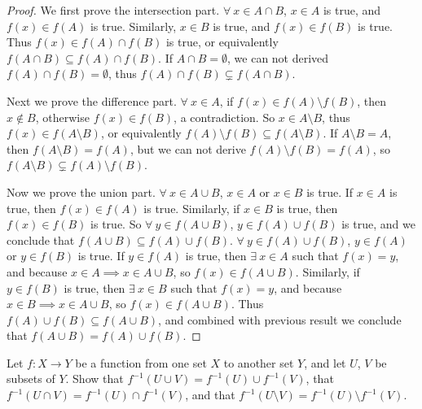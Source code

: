 \begin{proof}
We first prove the intersection part.
\(\forall\ x \in A \cap B\), \(x \in A\) is true, and \(f(x) \in f(A)\) is true.
Similarly, \(x \in B\) is true, and \(f(x) \in f(B)\) is true.
Thus \(f(x) \in f(A) \cap f(B)\) is true, or equivalently \(f(A \cap B) \subseteq f(A) \cap f(B)\).
If \(A \cap B = \emptyset\), we can not derived \(f(A) \cap f(B) = \emptyset\), thus \(f(A) \cap f(B) \subsetneq f(A \cap B)\).

Next we prove the difference part.
\(\forall\ x \in A\), if \(f(x) \in f(A) \setminus f(B)\), then \(x \notin B\), otherwise \(f(x) \in f(B)\), a contradiction.
So \(x \in A \setminus B\), thus \(f(x) \in f(A \setminus B)\), or equivalently \(f(A) \setminus f(B) \subseteq f(A \setminus B)\).
If \(A \setminus B = A\), then \(f(A \setminus B) = f(A)\), but we can not derive \(f(A) \setminus f(B) = f(A)\), so \(f(A \setminus B) \subsetneq f(A) \setminus f(B)\).

Now we prove the union part.
\(\forall\ x \in A \cup B\), \(x \in A\) or \(x \in B\) is true.
If \(x \in A\) is true, then \(f(x) \in f(A)\) is true.
Similarly, if \(x \in B\) is true, then \(f(x) \in f(B)\) is true.
So \(\forall\ y \in f(A \cup B)\), \(y \in f(A) \cup f(B)\) is true, and we conclude that \(f(A \cup B) \subseteq f(A) \cup f(B)\).
\(\forall\ y \in f(A) \cup f(B)\), \(y \in f(A)\) or \(y \in f(B)\) is true.
If \(y \in f(A)\) is true, then \(\exists\ x \in A\) such that \(f(x) = y\), and because \(x \in A \implies x \in A \cup B\), so \(f(x) \in f(A \cup B)\).
Similarly, if \(y \in f(B)\) is true, then \(\exists\ x \in B\) such that \(f(x) = y\), and because \(x \in B \implies x \in A \cup B\), so \(f(x) \in f(A \cup B)\).
Thus \(f(A) \cup f(B) \subseteq f(A \cup B)\), and combined with previous result we conclude that \(f(A \cup B) = f(A) \cup f(B)\).
\end{proof}

\begin{exercise}\label{exercise 3.4.4}
Let \(f : X \to Y\) be a function from one set \(X\) to another set \(Y\), and let \(U\), \(V\) be subsets of \(Y\). Show that \(f^{-1}(U \cup V) = f^{-1}(U) \cup f^{-1}(V)\), that
\(f^{-1}(U \cap V) = f^{-1}(U) \cap f^{-1}(V)\), and that \(f^{-1}(U \setminus V) = f^{-1}(U) \setminus f^{-1}(V)\).
\end{exercise}

